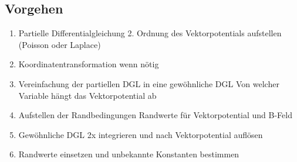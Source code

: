 \subsection{Vorgehen}
	\begin{enumerate}
		\item Partielle Differentialgleichung 2. Ordnung des Vektorpotentials aufstellen (Poisson oder Laplace)
		\item Koordinatentransformation wenn nötig
		\item Vereinfachung der partiellen DGL in eine gewöhnliche DGL 
		\subitem Von welcher Variable hängt das Vektorpotential ab
		\item Aufstellen der Randbedingungen
		\subitem Randwerte für Vektorpotential und B-Feld
		\item Gewöhnliche DGL 2x integrieren und nach Vektorpotential auflösen
		\item Randwerte einsetzen und unbekannte Konstanten bestimmen
	\end{enumerate}
\clearpage
\pagebreak